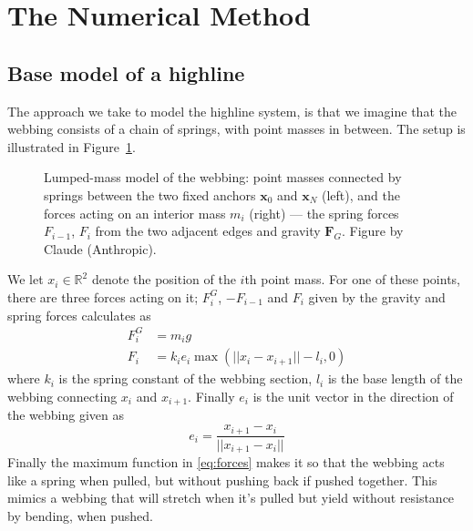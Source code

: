 \documentclass[a4paper,10pt]{article}
\newcommand{\R}{\mathbb{R}}
\begin{document}
\section{The Numerical Method}
\label{sec:nummethod}

\subsection{Base model of a highline}%
\label{sec:basemodel}

The approach we take to model the highline system, is that we imagine that the webbing consists of a chain of springs, with point masses in between. The setup is illustrated in Figure~\ref{fig:spring-chain}.  
%
  \begin{figure}[htbp]
    \centering
    
    \caption{Lumped-mass model of the webbing: point masses connected by
      springs between the two fixed anchors $\mathbf{x}_0$ and
      $\mathbf{x}_N$ (left), and the forces acting on an interior mass
      $m_i$ (right) --- the spring forces $F_{i-1}$, $F_i$ from the two
      adjacent edges and gravity $\mathbf{F}_G$.
      Figure by Claude (Anthropic).}
    \label{fig:spring-chain}
  \end{figure}
%
  We let \(x_i \in \R^2\) denote the position of the \(i\)th point mass. For one of these points, there are three forces acting on it; $F_i^G$, $-F_{i-1}$ and $F_i$ given by the gravity and spring forces calculates as
%
\begin{subequations}
\begin{align}
   \label{eq:forces}
   F_i^G &= m_i g \\
   F_{i} &= k_i e_{i} \max(||x_{i} - x_{i+1}|| - l_{i}, 0) 
\end{align}
\end{subequations}
%
where \(k_i\) is the spring constant of the webbing section, $l_i$ is the base length of the webbing connecting $x_i$ and $x_{i+1}$. Finally $e_i$ is the unit vector in the direction of the webbing given as
%
\begin{equation}
   e_{i} = \frac{x_{i+1} - x_i}{||x_{i+1} - x_i||}
\end{equation}
%
Finally the maximum function in \eqref{eq:forces} makes it so that the webbing acts like a spring when pulled, but without pushing back if pushed together. This mimics a webbing that will stretch when it's pulled but yield without resistance by bending, when pushed.
\end{document}
